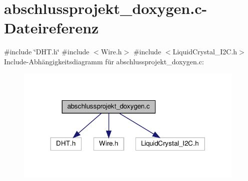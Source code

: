 \section{abschlussprojekt\+\_\+doxygen.\+c-\/\+Dateireferenz}
\label{abschlussprojekt__doxygen_8c}
{\ttfamily \#include \char`\"{}D\+H\+T.\+h\char`\"{}}\newline
{\ttfamily \#include $<$Wire.\+h$>$}\newline
{\ttfamily \#include $<$Liquid\+Crystal\+\_\+\+I2\+C.\+h$>$}\newline
Include-\/\+Abhängigkeitsdiagramm für abschlussprojekt\+\_\+doxygen.\+c\+:\nopagebreak
\begin{figure}[H]
\begin{center}
\leavevmode
\includegraphics[width=311pt]{abschlussprojekt__doxygen_8c__incl}
\end{center}
\end{figure}
